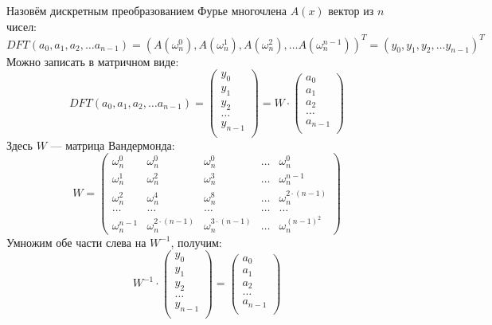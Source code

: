 Назовём дискретным преобразованием Фурье многочлена $A(x)$ вектор из $n$ чисел:
$$ DFT(a_0, a_1, a_2, \dots a_{n - 1}) = ( A(\omega_{n} ^ {0}), A(\omega_{n} ^ {1}), A(\omega_{n} ^ {2}), \dots A(\omega_{n} ^ {n - 1}) ) ^ T = (y_0, y_1, y_2, \dots y_{n - 1}) ^ T $$
Можно записать в матричном виде:
$$ DFT(a_0, a_1, a_2, \dots a_{n - 1}) =
\begin{pmatrix}
y_0 \\
y_1 \\
y_2 \\
\dots \\
y_{n - 1} \\
\end{pmatrix}
= W \cdot
\begin{pmatrix}
a_0 \\
a_1 \\
a_2 \\
\dots \\
a_{n - 1} \\
\end{pmatrix}
$$
Здесь $W$ --- матрица Вандермонда:
$$ W = \begin{pmatrix}
{\omega}_{n} ^ {0} & {\omega}_{n} ^ {0} & {\omega}_{n} ^ {0} & \dots & {\omega}_{n} ^ {0} \\
{\omega}_{n} ^ {1} & {\omega}_{n} ^ {2} & {\omega}_{n} ^ {3} & \dots & {\omega}_{n} ^ {n - 1} \\
{\omega}_{n} ^ {2} & {\omega}_{n} ^ {4} & {\omega}_{n} ^ {8} & \dots & {\omega}_{n} ^ {2 \cdot (n - 1)} \\
\dots & \dots & \dots & \dots & \dots \\
{\omega}_{n} ^ {n - 1} & {\omega}_{n} ^ {2 \cdot (n - 1)} & {\omega}_{n} ^ {3 \cdot (n - 1)} & \dots & {\omega}_{n} ^ {(n - 1) ^ 2}
\end{pmatrix}$$
Умножим обе части слева на $W^{-1}$, получим:
$$
W^{-1} \cdot
\begin{pmatrix}
y_0 \\
y_1 \\
y_2 \\
\dots \\
y_{n - 1} \\
\end{pmatrix}
=
\begin{pmatrix}
a_0 \\
a_1 \\
a_2 \\
\dots \\
a_{n - 1} \\
\end{pmatrix}
$$
